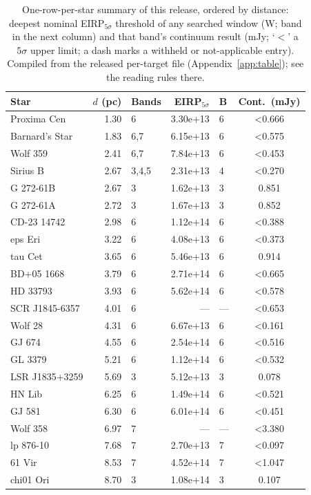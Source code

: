 \documentclass{openjournal}
\begin{document}
\begin{table}
\centering
\scriptsize
\setlength{\tabcolsep}{4pt}
\caption{One-row-per-star summary of this release, ordered by
distance: deepest nominal EIRP$_{5\sigma}$ threshold of any searched
window (W; band in the next column) and that band's continuum result
(mJy; `$<$' a $5\sigma$ upper limit; a dash marks a withheld or
not-applicable entry). Compiled from the released per-target file (Appendix~\ref{app:table}); see the reading rules
there.}
\label{tab:starsummary}
\begin{tabular}{@{}lrlrlc@{}}
\hline
Star & $d$ (pc) & Bands & EIRP$_{5\sigma}$ & B & Cont.\ (mJy) \\
\hline
Proxima Cen & 1.30 & 6 & 3.30e+13 & 6 & <0.666 \\
Barnard's Star & 1.83 & 6,7 & 6.15e+13 & 6 & <0.575 \\
Wolf  359 & 2.41 & 6,7 & 7.84e+13 & 6 & <0.453 \\
Sirius B & 2.67 & 3,4,5 & 2.31e+13 & 4 & <0.270 \\
G 272-61B & 2.67 & 3 & 1.62e+13 & 3 & 0.851 \\
G 272-61A & 2.72 & 3 & 1.67e+13 & 3 & 0.852 \\
CD-23 14742 & 2.98 & 6 & 1.12e+14 & 6 & <0.388 \\
eps Eri & 3.22 & 6 & 4.08e+13 & 6 & <0.373 \\
tau Cet & 3.65 & 6 & 5.46e+13 & 6 & 0.914 \\
BD+05  1668 & 3.79 & 6 & 2.71e+14 & 6 & <0.665 \\
HD 33793 & 3.93 & 6 & 5.62e+14 & 6 & <0.578 \\
SCR J1845-6357 & 4.01 & 6 & --- & --- & <0.653 \\
Wolf   28 & 4.31 & 6 & 6.67e+13 & 6 & <0.161 \\
GJ 674 & 4.55 & 6 & 2.54e+14 & 6 & <0.516 \\
GL 3379 & 5.21 & 6 & 1.12e+14 & 6 & <0.532 \\
LSR J1835+3259 & 5.69 & 3 & 5.12e+13 & 3 & 0.078 \\
HN Lib & 6.25 & 6 & 1.49e+14 & 6 & <0.521 \\
GJ 581 & 6.30 & 6 & 6.01e+14 & 6 & <0.451 \\
Wolf  358 & 6.97 & 7 & --- & --- & <3.380 \\
lp 876-10 & 7.68 & 7 & 2.70e+13 & 7 & <0.097 \\
61 Vir & 8.53 & 7 & 4.52e+14 & 7 & <1.047 \\
chi01 Ori & 8.70 & 3 & 1.08e+14 & 3 & 0.107 \\

\end{tabular}
\end{table}
\end{document}
